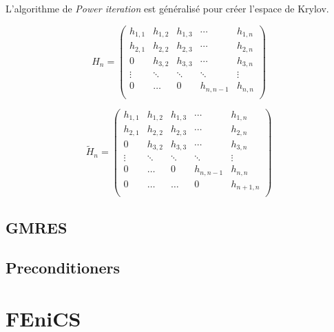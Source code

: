 L'algorithme de {\it Power iteration} est généralisé pour créer l'espace de Krylov.


$$
H_{n} = \left(
\begin{array}{ccccc}
h_{1,1} & h_{1,2} & h_{1,3} & \cdots & h_{1,n} \\
h_{2,1} & h_{2,2} & h_{2,3} & \cdots & h_{2,n} \\
0       & h_{3,2} & h_{3,3} & \cdots & h_{3,n} \\
\vdots  & \ddots  & \ddots  & \ddots & \vdots  \\
0       & \hdots  & 0       & h_{n,n-1} & h_{n,n} \\
\end{array}
\right)
$$

$$
\tilde{H}_{n} = \left(
\begin{array}{ccccc}
h_{1,1} & h_{1,2} & h_{1,3} & \cdots & h_{1,n} \\
h_{2,1} & h_{2,2} & h_{2,3} & \cdots & h_{2,n} \\
0       & h_{3,2} & h_{3,3} & \cdots & h_{3,n} \\
\vdots  & \ddots  & \ddots  & \ddots & \vdots  \\
0       & \hdots  & 0       & h_{n,n-1} & h_{n,n} \\
0       & \hdots  & \hdots  & 0         & h_{n+1,n} \\
\end{array}
\right)
$$

\subsection{GMRES}


\subsection{Preconditioners}



\newpage


\section{FEniCS}

\newpage


